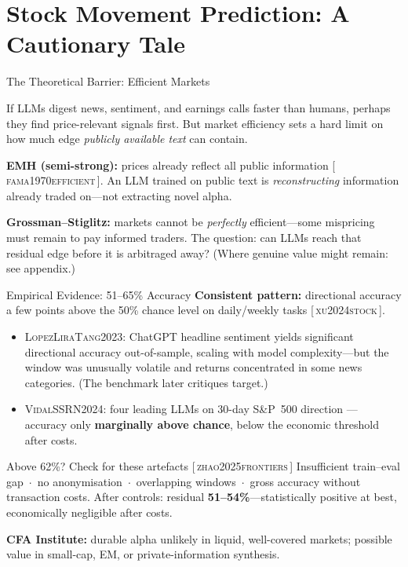 \documentclass[9pt,t]{beamer}
\newcommand{\citesrc}[1]{\textsc{\small #1}}
\providecommand{\citet}[1]{\citesrc{#1}}
\providecommand{\citep}[1]{{\footnotesize[\,\citesrc{#1}\,]}}
\begin{document}
\section{Stock Movement Prediction: A Cautionary Tale}

\begin{frame}{The Theoretical Barrier: Efficient Markets}
\begin{bigpicture}
If LLMs digest news, sentiment, and earnings calls faster than humans, perhaps
they find price-relevant signals first. But market efficiency sets a hard limit
on how much edge \emph{publicly available text} can contain.
\end{bigpicture}

\medskip
\textbf{EMH (semi-strong):} prices already reflect all public information
\citep{fama1970efficient}. An LLM trained on public text is
\emph{reconstructing} information already traded on---not extracting novel alpha.

\medskip
\textbf{Grossman--Stiglitz:} markets cannot be \emph{perfectly} efficient---some
mispricing must remain to pay informed traders. The question: can LLMs reach
that residual edge before it is arbitraged away? (Where genuine value might
remain: see appendix.)
\end{frame}

\begin{frame}{Empirical Evidence: 51--65\% Accuracy}
\textbf{Consistent pattern:} directional accuracy a few points above the 50\%
chance level on daily/weekly tasks \citep{xu2024stock}.

\medskip
\begin{itemize}
  \item \citet{LopezLiraTang2023}: ChatGPT headline sentiment yields significant
        directional accuracy out-of-sample, scaling with model complexity---but
        the window was unusually volatile and returns concentrated in some news
        categories. (The benchmark later critiques target.)
  \item \citet{VidalSSRN2024}: four leading LLMs on 30-day S\&P~500 direction ---
        accuracy only \textbf{marginally above chance}, below the economic
        threshold after costs.
\end{itemize}

\medskip
\begin{alertblock}{Above 62\%? Check for these artefacts \citep{zhao2025frontiers}}
Insufficient train--eval gap \,$\cdot$\, no anonymisation \,$\cdot$\, overlapping
windows \,$\cdot$\, gross accuracy without transaction costs. After controls:
residual \textbf{51--54\%}---statistically positive at best, economically
negligible after costs.
\end{alertblock}

\medskip
\textbf{CFA Institute:} durable alpha unlikely in liquid, well-covered markets;
possible value in small-cap, EM, or private-information synthesis.
\end{frame}
\end{document}
